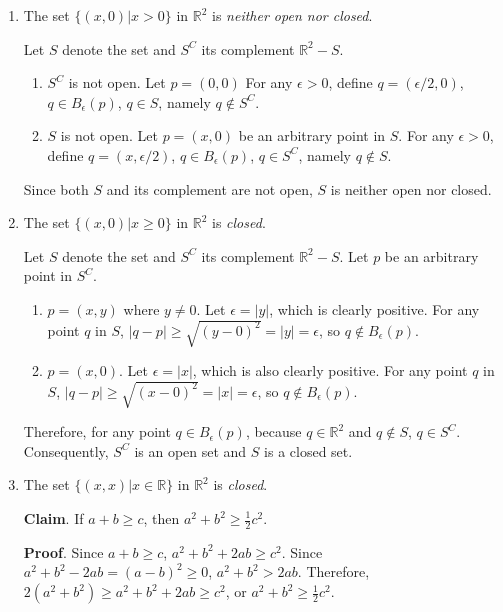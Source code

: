 \documentclass{homework}
\begin{document}
\begin{problem}{5}
\begin{enumerate}
\item The set $\{(x, 0) | x > 0\}$ in $\mathbb{R}^2$ is \emph{neither open nor closed}.

Let $S$ denote the set and $S^C$ its complement $\mathbb{R}^2 - S$.
\begin{enumerate}
\item $S^C$ is not open. Let $p = (0, 0)$ For any $\epsilon > 0$, define $q = (\epsilon/2, 0)$, $q \in B_{\epsilon}(p)$, $q \in S$, namely $q \notin S^C$. \QED

\item $S$ is not open. Let $p = (x, 0)$ be an arbitrary point in $S$. For any $\epsilon > 0$, define $q = (x, \epsilon/2)$, $q \in B_{\epsilon}(p)$, $q \in S^C$, namely $q \notin S$. \QED
\end{enumerate}

Since both $S$ and its complement are not open, $S$ is neither open nor closed. \QED

\item The set $\{(x, 0) | x \geq 0\}$ in $\mathbb{R}^2$ is \emph{closed}.

Let $S$ denote the set and $S^C$ its complement $\mathbb{R}^2 - S$. Let $p$ be an arbitrary point in $S^C$.
\begin{enumerate}
\item $p = (x, y)$ where $y \neq 0$. Let $\epsilon = |y|$, which is clearly positive. For any point $q$ in $S$, $|q - p| \geq \sqrt{(y - 0)^2} = |y| = \epsilon$, so $q \notin B_{\epsilon}(p)$.

\item $p = (x, 0)$. Let $\epsilon = |x|$, which is also clearly positive. For any point $q$ in $S$, $|q - p| \geq \sqrt{(x - 0)^2} = |x| = \epsilon$, so $q \notin B_{\epsilon}(p)$.
\end{enumerate}

Therefore, for any point $q \in B_{\epsilon}(p)$, because $q \in \mathbb{R}^2$ and $q \notin S$, $q \in S^C$. Consequently, $S^C$ is an open set and $S$ is a closed set. \QED

\item The set $\{(x, x) | x \in \mathbb{R}\}$ in $\mathbb{R}^2$ is \emph{closed}.\par
\textbf{Claim}. If $a + b \geq c$, then $a^2 + b^2 \geq \frac{1}{2}c^2$.\par
\textbf{Proof}. Since $a + b \geq c$, $a^2 + b^2 + 2ab \geq c^2$. Since $a^2 + b^2 - 2ab = (a-b)^2 \geq 0$, $a^2 + b^2 > 2ab$. Therefore, $2(a^2 + b^2) \geq a^2 + b^2 + 2ab \geq c^2$, or $a^2 + b^2 \geq \frac{1}{2} c^2$. \QED


\end{enumerate}
\end{problem}
\end{document}
